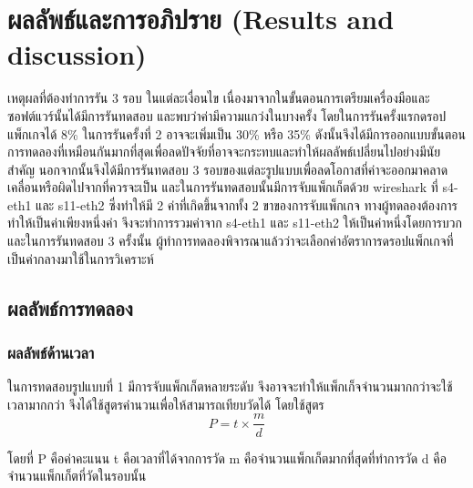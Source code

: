 \section{ผลลัพธ์และการอภิปราย (Results and discussion)}
เหตุผลที่ต้องทำการรัน 3 รอบ ในแต่ละเงื่อนไข เนื่องมาจากในขั้นตอนการเตรียมเครื่องมือและซอฟต์แวร์นั้นได้มีการรันทดสอบ และพบว่าค่ามีความแกว่งในบางครั้ง โดยในการรันครั้งแรกดรอปแพ็กเกจได้ 8\% ในการรันครั้งที่ 2 อาจจะเพิ่มเป็น 30\% หรือ 35\% 
ดังนั้นจึงได้มีการออกแบบขั้นตอนการทดลองที่เหมือนกันมากที่สุดเพื่อลดปัจจัยที่อาจจะกระทบและทำให้ผลลัพธ์เปลี่ยนไปอย่างมีนัยสำคัญ นอกจากนั้นจึงได้มีการรันทดสอบ 3 รอบของแต่ละรูปแบบเพื่อลดโอกาสที่ค่าจะออกมาคลาดเคลื่อนหรือผิดไปจากที่ควรจะเป็น 
และในการรันทดสอบนั้นมีการจับแพ็กเก็ตด้วย wireshark ที่ s4-eth1 และ s11-eth2 ซึ่งทำให้มี 2 ค่าที่เกิดขึ้นจากทั้ง 2 ขาของการจับแพ็กเกจ ทางผู้ทดลองต้องการทำให้เป็นค่าเพียงหนึ่งค่า
จึงจะทำการรวมค่าจาก s4-eth1 และ s11-eth2 ให้เป็นค่าหนึ่งโดยการบวก และในการรันทดสอบ 3 ครั้งนั้น 
ผู้ทำการทดลองพิจารณาแล้วว่าจะเลือกค่าอัตราการดรอปแพ็กเกจที่เป็นค่ากลางมาใช้ในการวิเคราะห์
\\
\subsection{ผลลัพธ์การทดลอง}
\subsubsection*{ผลลัพธ์ด้านเวลา}

%
%
ในการทดสอบรูปแบบที่ 1 มีการจับแพ็กเก็ตหลายระดับ จึงอาจจะทำให้แพ็กเก็จจำนวนมากกว่าจะใช้เวลามากกว่า
จึงได้ใช้สูตรคำนวนเพื่อให้สามารถเทียบวัดได้ โดยใช้สูตร
$$P=t \times \frac{m}{d}$$

โดยที่ P คือค่าคะแนน t คือเวลาที่ได้จากการวัด m คือจำนวนแพ็กเก็ตมากที่สุดที่ทำการวัด d คือจำนวนแพ็กเก็ตที่วัดในรอบนั้น

